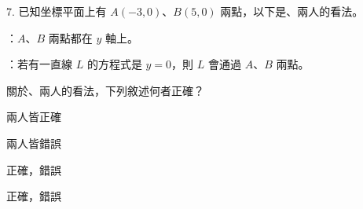 \documentclass[12pt]{article}
\begin{document}
\begin{problem}
  \item[7.] 已知坐標平面上有 $A(-3, 0)$、$B(5, 0)$ 兩點，以下是、兩人的看法。
  
  ：$A$、$B$ 兩點都在 $y$ 軸上。

  ：若有一直線 $L$ 的方程式是 $y = 0$，則 $L$ 會通過 $A$、$B$ 兩點。

  關於、兩人的看法，下列敘述何者正確？
  \begin{choices}
    \item 兩人皆正確
    \item 兩人皆錯誤
    \item {}正確，錯誤
    \item {}正確，錯誤
  \end{choices}
\end{problem}
\end{document}

